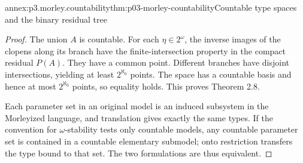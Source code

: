 \begin{annexitem}{annex:p3.morley.countability}{thm:p03-morley-countability}{Countable type spaces and the binary residual tree}
\begin{proof}
The union \(A\) is countable. For each
\(\eta\in2^\omega\), the inverse images of the clopens
along its branch have the finite-intersection property in
the compact residual \(P(A)\). They have a common point.
Different branches have disjoint intersections, yielding
at least \(2^{\aleph_0}\) points. The space has a countable
basis and hence at most \(2^{\aleph_0}\) points, so equality
holds. This proves Theorem 2.8.

Each parameter set in an original model is an induced
subsystem in the Morleyized language, and translation gives
exactly the same types. If the convention for
\(\omega\)-stability tests only countable models, any
countable parameter set is contained in a countable
elementary submodel; onto restriction transfers the type
bound to that set. The two formulations are thus equivalent.
\end{proof}
\end{annexitem}

